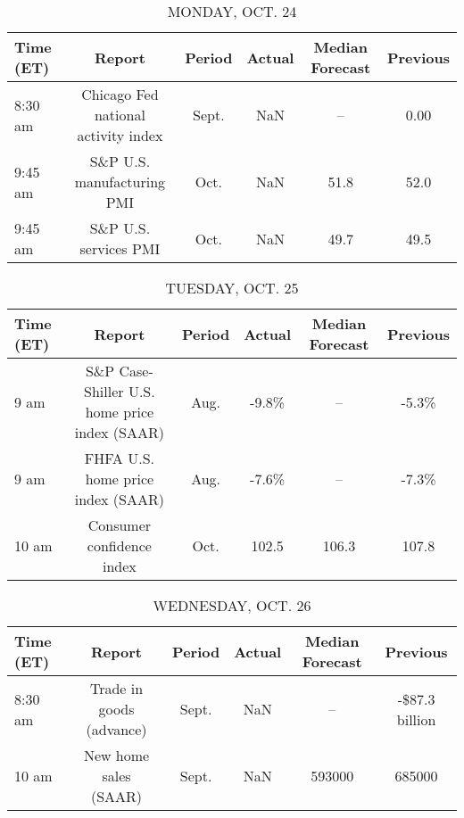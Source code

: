 \documentclass{article}%
\begin{document}
%
\normalsize%


\begin{table}[htbp]%
\caption{MONDAY, OCT. 24}%
\centering%
\begin{adjustbox}{width=1\textwidth}%
\begin{tabular}{lccccc}
\toprule
Time (ET) &                              Report & Period & Actual & Median Forecast & Previous \\
\midrule
  8:30 am & Chicago Fed national activity index &  Sept. &    NaN &              -- &     0.00 \\
  9:45 am &          S\&P U.S. manufacturing PMI &   Oct. &    NaN &            51.8 &     52.0 \\
  9:45 am &               S\&P U.S. services PMI &   Oct. &    NaN &            49.7 &     49.5 \\
\bottomrule
\end{tabular}
%
\end{adjustbox}%
\end{table}

%


\begin{table}[htbp]%
\caption{TUESDAY, OCT. 25}%
\centering%
\begin{adjustbox}{width=1\textwidth}%
\begin{tabular}{lccccc}
\toprule
Time (ET) &                                        Report & Period & Actual & Median Forecast & Previous \\
\midrule
     9 am & S\&P Case-Shiller U.S. home price index (SAAR) &   Aug. &  -9.8\% &              -- &    -5.3\% \\
     9 am &             FHFA U.S. home price index (SAAR) &   Aug. &  -7.6\% &              -- &    -7.3\% \\
    10 am &                     Consumer confidence index &   Oct. &  102.5 &           106.3 &    107.8 \\
\bottomrule
\end{tabular}
%
\end{adjustbox}%
\end{table}

%


\begin{table}[htbp]%
\caption{WEDNESDAY, OCT. 26}%
\centering%
\begin{adjustbox}{width=1\textwidth}%
\begin{tabular}{lccccc}
\toprule
Time (ET) &                   Report & Period & Actual & Median Forecast &       Previous \\
\midrule
  8:30 am & Trade in goods (advance) &  Sept. &    NaN &              -- & -\$87.3 billion \\
    10 am &    New home sales (SAAR) &  Sept. &    NaN &          593000 &         685000 \\
\bottomrule
\end{tabular}
%
\end{adjustbox}%
\end{table}
\end{document}
